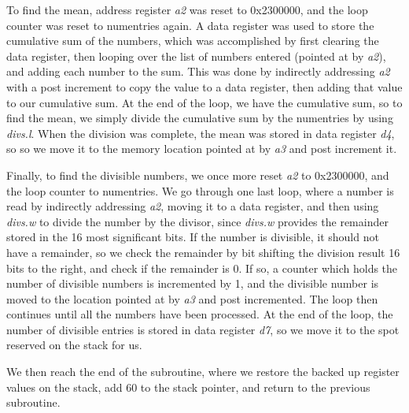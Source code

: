 \documentclass[letterpaper]{article}
\begin{document}
    To find the mean, address register \textit{a2} was reset to 0x2300000,
    and the loop counter was reset to numentries again. A data register was used
    to store the cumulative sum of the numbers, which was accomplished by
    first clearing the data register, then looping over the list of
    numbers entered (pointed at by \textit{a2}), and adding each number
    to the sum. This was done by indirectly addressing \textit{a2} with
    a post increment to copy the value to a data register, then adding
    that value to our cumulative sum. At the end of the loop, we have the
    cumulative sum, so to
    find the mean, we simply divide the cumulative sum by the numentries
    by using \textit{divs.l}. When the division was complete, the
    mean was stored in data register \textit{d4}, so so we move it to
    the memory location pointed at by \textit{a3} and post increment it.

    Finally, to find the divisible numbers, we once more reset \textit{a2}
    to 0x2300000, and the loop counter to numentries. We go through one last loop,
    where a number is read by indirectly addressing \textit{a2}, moving it to
    a data register, and then using \textit{divs.w} to divide the number by the
    divisor, since \textit{divs.w} provides the remainder stored in the
    16 most significant bits. If the number is divisible, it
    should not have a remainder, so we check the remainder by
    bit shifting the division result 16 bits to the right, and check if
    the remainder is 0. If so, a counter which holds the number of
    divisible numbers is incremented by 1, and the divisible number
    is moved to the location pointed at by \textit{a3} and post incremented.
    The loop then continues until all the numbers have been processed. At the
    end of the loop, the number of divisible entries is stored in data register \textit{d7},
    so we move it to the spot reserved on the stack for us.

    We then reach the end of the subroutine, where we restore the backed up register values
    on the stack, add 60 to the stack pointer, and return to the previous subroutine.


\end{document}
